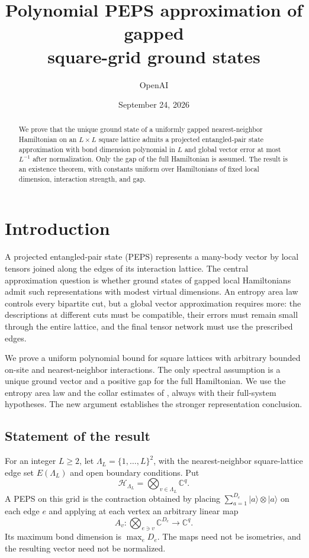 \documentclass[11pt]{article}
\title{Polynomial PEPS approximation of gapped\texorpdfstring{\\}{ }square-grid ground states}
\author{OpenAI}
\date{September 24, 2026}
\numberwithin{equation}{section}
\theoremstyle{definition}
\theoremstyle{remark}
\begin{document}
\begin{abstract}
We prove that the unique ground state of a uniformly gapped nearest-neighbor
Hamiltonian on an $L\times L$ square lattice admits a projected entangled-pair
state approximation with bond dimension polynomial in $L$ and global vector
error at most $L^{-1}$ after normalization. Only the gap of the full Hamiltonian is assumed.
The result is an existence theorem, with constants uniform over
Hamiltonians of fixed local dimension, interaction strength, and gap.
\end{abstract}
\tableofcontents
 
\section{Introduction}\label{sec:introduction}

A projected entangled-pair state (PEPS) represents a many-body vector by local
tensors joined along the edges of its interaction lattice. The central
approximation question is whether ground states of gapped local Hamiltonians
admit such representations with modest virtual dimensions. An entropy area
law controls every bipartite cut, but a global vector approximation requires
more: the descriptions at different cuts must be compatible, their errors
must remain small through the entire lattice, and the final tensor network
must use the prescribed edges.

We prove a uniform polynomial bound for square lattices with arbitrary
bounded on-site and nearest-neighbor interactions. The only spectral
assumption is a unique ground vector and a positive gap for the full
Hamiltonian. We use the entropy area law and the collar estimates of
\cite{RepoAreaLaw}, always with their full-system hypotheses. The new argument
establishes the stronger representation conclusion.

\subsection{Statement of the result}

For an integer $L\ge2$, let $\Lambda_L=\{1,\ldots,L\}^2$, with the
nearest-neighbor square-lattice edge set $E(\Lambda_L)$ and open boundary
conditions. Put
\[
 \mathcal H_{\Lambda_L}=\bigotimes_{v\in\Lambda_L}\mathbb C^q.
\]
A PEPS on this grid is the contraction obtained by placing
$\sum_{a=1}^{D_e}|a\rangle\otimes|a\rangle$ on each edge $e$ and applying
at each vertex an arbitrary linear map
\[
 A_v:\bigotimes_{e\ni v}\mathbb C^{D_e}\longrightarrow\mathbb C^q.
\]
Its maximum bond dimension is $\max_eD_e$. The maps need not be isometries,
and the resulting vector need not be normalized.
\end{document}
